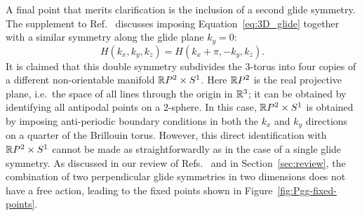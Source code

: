 A final point that merits clarification is the inclusion of a second glide symmetry. The supplement to Ref.~\cite{Fonseca-Vaidya_nonorientable} discusses imposing Equation~\eqref{eq:3D_glide} together with a similar symmetry along the glide plane $k_y = 0$:
\begin{equation}
	H(k_x, k_y, k_z) = H(k_x + \pi, -k_y, k_z).
\end{equation}
It is claimed that this double symmetry subdivides the 3-torus into four copies of a different non-orientable manifold $\mathbb{R} P^2\times S^1$. Here $\mathbb{R} P^2$ is the real projective plane, i.e.\ the space of all lines through the origin in $\mathbb{R}^3$; it can be obtained by identifying all antipodal points on a 2-sphere. In this case, $\mathbb{R} P^2\times S^1$ is obtained by imposing anti-periodic boundary conditions in both the $k_x$ and $k_y$ directions on a quarter of the Brillouin torus. However, this direct identification with $\mathbb{R} P^2\times S^1$ cannot be made as straightforwardly as in the case of a single glide symmetry. As discussed in our review of Refs.~\cite{HZY_RP2} and \cite{WangZhang_acoustic-Klein-2D} in Section~\ref{sec:review}, the combination of two perpendicular glide symmetries in two dimensions does not have a free action, leading to the fixed points shown in Figure~\ref{fig:Pgg-fixed-points}.

